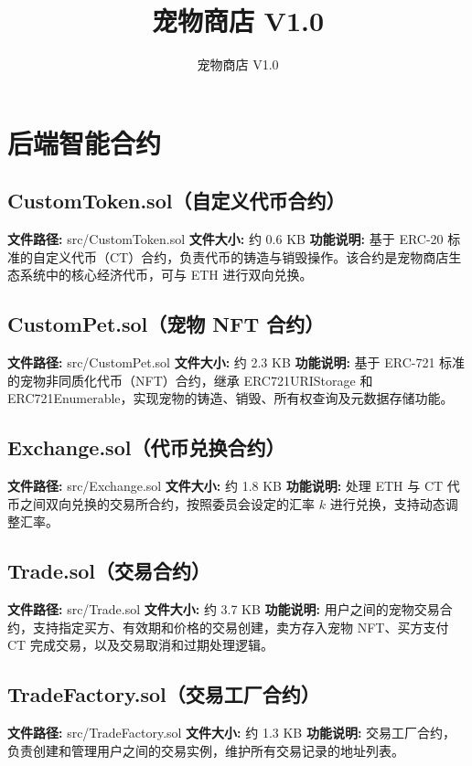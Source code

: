 \documentclass[code]{mancls}
\title{宠物商店 V1.0}
\author{宠物商店 V1.0}
\begin{document}
\section{后端智能合约}

\subsection{CustomToken.sol（自定义代币合约）}
\textbf{文件路径:} src/CustomToken.sol
\textbf{文件大小:} 约 0.6 KB
\textbf{功能说明:} 基于 ERC-20 标准的自定义代币（CT）合约，负责代币的铸造与销毁操作。该合约是宠物商店生态系统中的核心经济代币，可与 ETH 进行双向兑换。



\subsection{CustomPet.sol（宠物 NFT 合约）}
\textbf{文件路径:} src/CustomPet.sol
\textbf{文件大小:} 约 2.3 KB
\textbf{功能说明:} 基于 ERC-721 标准的宠物非同质化代币（NFT）合约，继承 ERC721URIStorage 和 ERC721Enumerable，实现宠物的铸造、销毁、所有权查询及元数据存储功能。



\subsection{Exchange.sol（代币兑换合约）}
\textbf{文件路径:} src/Exchange.sol
\textbf{文件大小:} 约 1.8 KB
\textbf{功能说明:} 处理 ETH 与 CT 代币之间双向兑换的交易所合约，按照委员会设定的汇率 $k$ 进行兑换，支持动态调整汇率。



\subsection{Trade.sol（交易合约）}
\textbf{文件路径:} src/Trade.sol
\textbf{文件大小:} 约 3.7 KB
\textbf{功能说明:} 用户之间的宠物交易合约，支持指定买方、有效期和价格的交易创建，卖方存入宠物 NFT、买方支付 CT 完成交易，以及交易取消和过期处理逻辑。



\subsection{TradeFactory.sol（交易工厂合约）}
\textbf{文件路径:} src/TradeFactory.sol
\textbf{文件大小:} 约 1.3 KB
\textbf{功能说明:} 交易工厂合约，负责创建和管理用户之间的交易实例，维护所有交易记录的地址列表。
\end{document}
